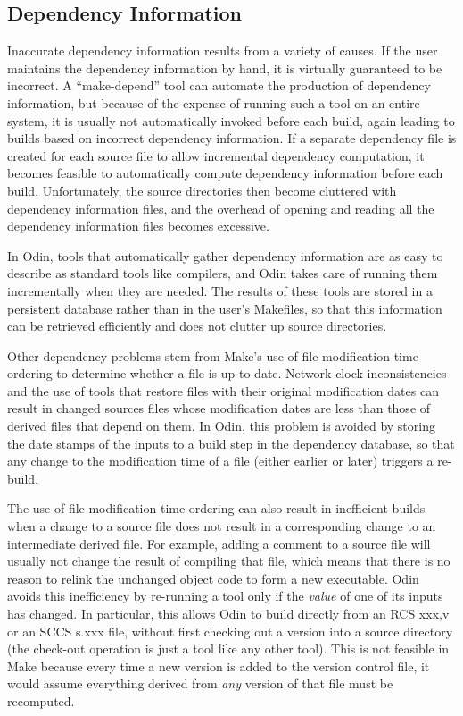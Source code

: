 \subsection{Dependency Information}

Inaccurate dependency information results from a variety of causes.
If the user maintains the dependency information by hand,
it is virtually guaranteed to be incorrect.
A ``make-depend'' tool can automate the production of dependency information,
but because of the expense of running such a tool on an entire system,
it is usually not automatically invoked before each build,
again leading to builds based on incorrect dependency information.
If a separate dependency file is created for each source file
to allow incremental dependency computation,
it becomes feasible to automatically compute dependency information
before each build.
Unfortunately, the source directories then become cluttered with
dependency information files,
and the overhead of opening and reading all the dependency information
files becomes excessive.

In Odin, tools that automatically gather dependency information are
as easy to describe as standard tools like compilers,
and Odin takes care of running them incrementally when they are needed.
The results of these tools are stored in a persistent database
rather than in the user's Makefiles,
so that this information can be retrieved efficiently and does
not clutter up source directories.

Other dependency problems stem from Make's use of file modification time
ordering to determine whether a file is up-to-date.
Network clock inconsistencies and the use of tools
that restore files with their original modification dates
can result in changed sources files whose modification dates are less
than those of derived files that depend on them.
In Odin, this problem is avoided by storing 
the date stamps of the inputs to a build step in the dependency database,
so that any change to the modification time of a file (either earlier or later)
triggers a re-build.

The use of file modification time ordering
can also result in inefficient builds
when a change to a source file does not result in a corresponding change
to an intermediate derived file.
For example, adding a comment to a source file will usually not change
the result of compiling that file,
which means that there is no reason to relink the unchanged object code
to form a new executable.
Odin avoids this inefficiency by re-running a tool only if the
{\em value} of one of its inputs has changed.
In particular, this allows Odin to build directly from an RCS {\ex xxx,v}
or an SCCS {\ex s.xxx} file,
without first checking out a version into a source directory
(the check-out operation is just a tool like any other tool).
This is not feasible in Make because every time a new version is
added to the version control file,
it would assume everything derived from {\em any} version of that file
must be recomputed.


